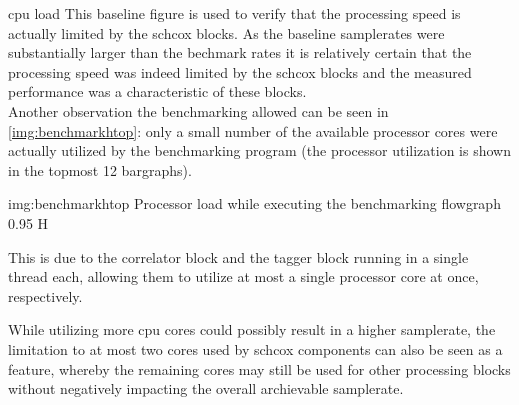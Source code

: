 \begin{subchapter}{\Acrshort{cpu} load}
  This baseline figure is used to verify that the
  processing speed is actually limited by the \gls{schcox} blocks.
  As the baseline samplerates were substantially larger
  than the bechmark rates it is relatively certain that
  the processing speed was indeed limited by the \gls{schcox} blocks
  and the measured performance was a characteristic of these blocks. \\

  Another observation the benchmarking allowed can be seen
  in \autoref{img:benchmarkhtop}: only a small number of the available
  processor cores were actually utilized by the benchmarking program
  (the processor utilization is shown in the topmost 12 bargraphs).

                  {img:benchmarkhtop}
                  {Processor load while executing the benchmarking flowgraph}
                  {0.95}
                  {H}

  This is due to the correlator block and the tagger block running
  in a single thread each, allowing them to utilize at most
  a single processor core at once, respectively.

  While utilizing more \gls{cpu} cores could possibly
  result in a higher samplerate, the limitation to at most
  two cores used by \gls{schcox} components can
  also be seen as a feature, whereby the remaining cores
  may still be used for other processing blocks without
  negatively impacting the overall archievable samplerate.
\end{subchapter}
